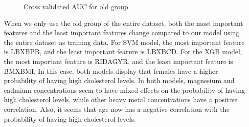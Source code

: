 \documentclass{article}
\begin{document}
\begin{figure}[!ht]
    \centering
    \qquad
    \caption{Cross validated AUC for old group}
\end{figure}

When we only use the old group of the entire dataset, both the most important features and the least important features change compared to our model using the entire dataset as training data. For SVM model, the most important feature is LBXBPB, and the least important feature is LBXBCD. For the XGB model, the most important feature is RIDAGYR, and the least important feature is BMXBMI. In this case, both models display that females have a higher probability of having high cholesterol levels. In both models, magnesium and cadmium concentrations seem to have mixed effects on the probability of having high cholesterol levels, while other heavy metal concentrations have a positive correlation. Also, it seems that age now has a negative correlation with the probability of having high cholesterol levels.
\end{document}
